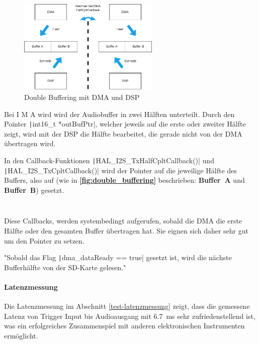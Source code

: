 \begin{figure}[H]
	\centering
	\includegraphics[width=0.6\textwidth]{images/08_durchfuehrung/audio/double_buffering.drawio.png}
	\caption{Double Buffering mit DMA und DSP}
	\label{fig:double_buffering}
\end{figure}


Bei I M A wird wird der Audiobuffer in zwei Hälften unterteilt.
Durch den Pointer \texttt|int16_t *outBufPtr|, welcher jeweils auf die erste oder zweiter Hälfte zeigt, wird mit der DSP die Hälfte bearbeitet, die gerade nicht von der DMA übertragen wird.

In den Callback-Funktionen \texttt|HAL_I2S_TxHalfCpltCallback()| und \texttt|HAL_I2S_TxCpltCallback()| wird der Pointer auf die jeweilige Hälfte des Buffers, also auf (wie in  \textbf{\autoref{fig:double_buffering}} beschrieben:
\textbf{Buffer~A} und \textbf{Buffer~B}) gesetzt.


\inputminted[firstline=28, lastline=31]{c}{../../f401_sd_card_audio_codec_test/Core/Src/audio.c}

\inputminted[firstline=40, lastline=43]{c}{../../f401_sd_card_audio_codec_test/Core/Src/audio.c}


Diese Callbacks, werden systembedingt aufgerufen, sobald die DMA die erste Hälfte oder den gesamten Buffer übertragen hat. Sie eignen sich daher sehr gut um den Pointer zu setzen.

"Sobald das Flag \texttt|dma_dataReady == true| gesetzt ist, wird die nächste Bufferhälfte von der SD-Karte gelesen."

\paragraph{Latenzmessung}

Die Latenzmessung im Abschnitt \ref{test-latenzmessung} zeigt, dass die gemessene Latenz von Trigger Input bis Audioausgang mit \SI{6.7}{\milli\second} sehr zufriedenstellend ist, was ein erfolgreiches Zusammenspiel mit anderen elektronischen Instrumenten ermöglicht.


